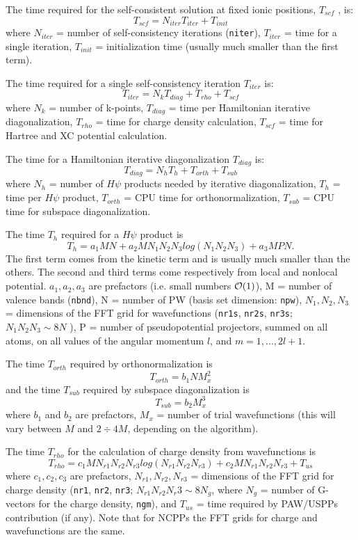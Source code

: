 \documentclass[12pt,a4paper]{article}
\begin{document}
The time required for the self-consistent solution at fixed ionic
positions, $T_{scf}$ , is:
$$T_{scf} = N_{iter} T_{iter} + T_{init}$$
where $N_{iter}$  = number of self-consistency iterations (\texttt{niter}), 
$T_{iter}$ =
time for a single iteration, $T_{init}$ = initialization time
(usually much smaller than the first term).

The time required for a single self-consistency iteration $T_{iter}$ is:
$$T_{iter} = N_k T_{diag} +T_{rho} + T_{scf}$$
where $N_k$ = number of k-points, $T_{diag}$ = time per 
Hamiltonian iterative diagonalization, $T_{rho}$ = time for charge density 
calculation, $T_{scf}$ = time for Hartree and XC potential
calculation.
    
The time for a Hamiltonian iterative diagonalization $T_{diag}$ is:
$$T_{diag} = N_h T_h + T_{orth} + T_{sub}$$
where $N_h$ = number of $H\psi$ products needed by iterative diagonalization,
$T_h$ = time per $H\psi$ product, $T_{orth}$ = CPU time for 
orthonormalization, $T_{sub}$ = CPU time for subspace diagonalization.
    
The time $T_h$ required for a $H\psi$ product is
$$T_h = a_1 M N + a_2 M N_1 N_2 N_3 log(N_1 N_2 N_3 ) + a_3 M P N. $$
The first term comes from the kinetic term and is usually much smaller
than the others. The second and third terms come respectively from local
and nonlocal potential. $a_1, a_2, a_3$ are prefactors (i.e.
small numbers ${\cal O}(1)$), M = number of valence
bands (\texttt{nbnd}), N = number of PW (basis set dimension: \texttt{npw}), $N_1, N_2, N_3$ =
dimensions of the FFT grid for wavefunctions (\texttt{nr1s}, \texttt{nr2s},
\texttt{nr3s}; $N_1 N_2 N_3 \sim 8N$ ), 
P = number of pseudopotential projectors, summed on all atoms, on all values of the
angular momentum $l$, and $m = 1, . . . , 2l + 1$.

The time $T_{orth}$ required by orthonormalization is
$$T_{orth} = b_1 N M_x^2$$ 
and the time $T_{sub}$ required by subspace diagonalization is
$$T_{sub} = b_2 M_x^3$$
where $b_1$ and $b_2$ are prefactors, $M_x$ = number of trial wavefunctions 
(this will vary between $M$ and $2\div4 M$, depending on the algorithm).
    
The time $T_{rho}$ for the calculation of charge density from wavefunctions is
$$T_{rho} = c_1 M N_{r1} N_{r2}N_{r3} log(N_{r1} N_{r2} N_{r3}) + 
            c_2 M N_{r1} N_{r2} N_{r3} + T_{us}$$
where $c_1, c_2, c_3$ are prefactors, $N_{r1}, N_{r2}, N_{r3}$ =
dimensions of the FFT grid for charge density (\texttt{nr1},
\texttt{nr2}, \texttt{nr3}; $N_{r1} N_{r2} N_r3 \sim 8N_g$,
where $N_g$ = number of G-vectors for the charge density,
\texttt{ngm}), and 
$T_{us}$ = time required by PAW/USPPs contribution (if any).
Note that for NCPPs the FFT grids for charge and
wavefunctions are the same.
 
\end{document}
